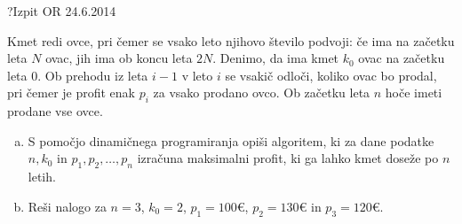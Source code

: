 \begin{naloga}{?}{Izpit OR 24.6.2014}
\begin{vprasanje}
Kmet redi ovce, pri čemer se vsako leto njihovo število podvoji:
če ima na začetku leta $N$ ovac, jih ima ob koncu leta $2N$.
Denimo, da ima kmet $k_0$ ovac na začetku leta $0$.
Ob prehodu iz leta $i-1$ v leto $i$ se vsakič odloči,
koliko ovac bo prodal, pri čemer je profit enak $p_i$ za vsako prodano ovco.
Ob začetku leta $n$ hoče imeti prodane vse ovce.

\begin{enumerate}[(a)]
\item S pomočjo dinamičnega programiranja opiši algoritem,
ki za dane podatke $n, k_0$ in $p_1, p_2, \dots, p_n$
izračuna maksimalni profit, ki ga lahko kmet doseže po $n$ letih.

\item Reši nalogo za $n = 3$, $k_0 = 2$,
$p_1 = 100 €$, $p_2 = 130 €$ in $p_3 = 120 €$.
\end{enumerate}
\end{vprasanje}
\begin{odgovor}
\end{odgovor}
\end{naloga}

